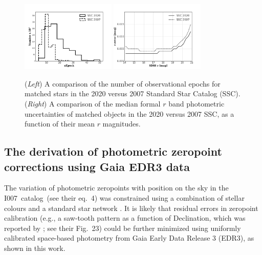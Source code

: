 \documentclass[fleqn,usenatbib]{mnras}
\newcommand{\pOc}{\hbox{I007 catalog}}
\begin{document}
\begin{figure}
\centering
\includegraphics[width=0.4\textwidth, keepaspectratio]{figures/nepoch_compOvsN_BW.png}
\includegraphics[width=0.4\textwidth, keepaspectratio]{figures/rerr_compOvsN_BW.png}
\caption{({\it Left}) A comparison of the number of observational epochs for matched stars in the 2020 versus 2007 Standard Star Catalog (SSC). ({\it Right}) A comparison of the median formal $r$ band photometric uncertainties of matched objects in the 2020 versus 2007 SSC, as a function of their mean $r$ magnitudes.
\label{fig:rerr_nvso}}
\end{figure}


\subsection{The derivation of  photometric zeropoint corrections using Gaia EDR3 data\label{sec:GaiaCorr}} 

The variation of photometric zeropoints with position on the sky in the \pOc\ (see their eq.~4) was 
constrained using a combination of stellar colours \citep[the principal axes in colour-colour diagrams, for details 
see][]{2004AN....325..583I} and a standard star network \citep{2002AJ....123.2121S,2006AN....327..821T}. It is likely that 
residual errors in zeropoint calibration (e.g., a saw-tooth pattern as a function of Declination,
which was reported by \citealt{2013A&A...552A.124B}; see their Fig.~23) could be further minimized using 
uniformly calibrated space-based photometry from Gaia Early Data Release 3 (EDR3), as shown in this work. 
\end{document}
